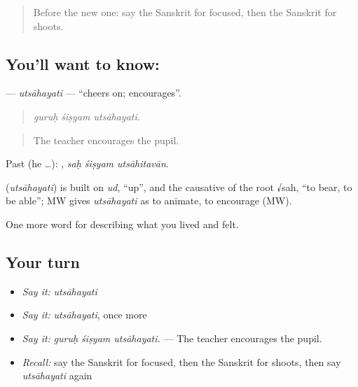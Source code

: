 \label{lesson:SA-C527-utsahayati}



\begin{quote}
Before the new one: say the Sanskrit for focused, then the Sanskrit for shoots.
\end{quote}

\subsection*{You'll want to know: }
\textbf{} — \emph{utsāhayati} — \textquotedblleft{}cheers on; encourages\textquotedblright{}.

\begin{quote}
  
\end{quote}

\begin{quote}
\emph{guruḥ śiṣyam utsāhayati.}
\end{quote}

\begin{quote}
The teacher encourages the pupil.
\end{quote}

Past (he …):   , \emph{saḥ śiṣyam utsāhitavān}.

\begin{cousinweb}
\textbf{} (\emph{utsāhayati}) is built on \emph{ud}, \textquotedblleft{}up\textquotedblright{}, and the causative of the root √sah, \textquotedblleft{}to bear, to be able\textquotedblright{}; MW gives \emph{utsāhayati} as to animate, to encourage (MW).
\end{cousinweb}

\begin{grammarlens}[title={What you've built}]
One more word for describing what you lived and felt.
\end{grammarlens}

\subsection*{Your turn}
\begin{itemize}
\raggedright
  \item \emph{Say it:} \emph{utsāhayati}
  \item \emph{Say it:} \emph{utsāhayati}, once more
  \item \emph{Say it:} \emph{guruḥ śiṣyam utsāhayati.} — The teacher encourages the pupil.
  \item \emph{Recall:} say the Sanskrit for focused, then the Sanskrit for shoots, then say \emph{utsāhayati} again
\end{itemize}

